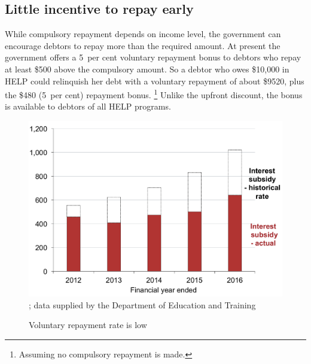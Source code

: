 \documentclass[embargoed]{grattan}
\begin{document}
\subsection{Little incentive to repay early}\label{little-incentive-to-repay-early}

While compulsory repayment depends on income level, the government can encourage debtors to repay more than the required amount.
At present the government offers a 5~per cent voluntary repayment bonus to debtors who repay at least \$500 above the compulsory amount.
So a debtor who owes \$10,000 in \gls{HELP} could relinquish her debt with a voluntary repayment of about \$9520, plus the \$480 (5~per cent) repayment bonus.%
\footnote{Assuming no compulsory repayment is made.} 
Unlike the upfront discount, the bonus is available to debtors of all \gls{HELP} programs.

\begin{figure}
\caption{Voluntary repayment rate is low}\label{fig:fig8-voluntary-repayment-rate-is-low}

\includegraphics[page=8]{atlas/Chartpack.pdf}
{\textcites{Jackson2003TheHigherEducationContributionScheme}{Education2015Highereducationreport}; data supplied by the Department of Education and Training}
\end{figure}
\end{document}
